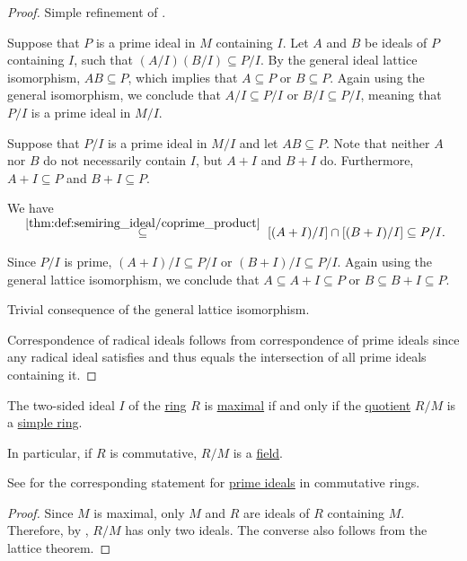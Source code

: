 \begin{proof}
   Simple refinement of .

  \SufficiencySubProof* Suppose that \( P \) is a prime ideal in \( M \) containing \( I \). Let \( A \) and \( B \) be ideals of \( P \) containing \( I \), such that \( (A / I) (B / I) \subseteq P / I \). By the general ideal lattice isomorphism, \( AB \subseteq P \), which implies that \( A \subseteq P \) or \( B \subseteq P \). Again using the general isomorphism, we conclude that \( A / I \subseteq P / I \) or \( B / I \subseteq P / I \), meaning that \( P / I \) is a prime ideal in \( M / I \).

  \NecessitySubProof* Suppose that \( P / I \) is a prime ideal in \( M / I \) and let \( AB \subseteq P \). Note that neither \( A \) nor \( B \) do not necessarily contain \( I \), but \( A + I \) and \( B + I \) do. Furthermore, \( A + I \subseteq P \) and \( B + I \subseteq P \).

  We have
  \begin{equation*}
    [(A + I) / I][(B + I) / I]
    \reloset {\ref{thm:def:semiring_ideal/coprime_product}} \subseteq
    [(A + I) / I] \cap [(B + I) / I]
    \subseteq
    P / I.
  \end{equation*}

  Since \( P / I \) is prime, \( (A + I) / I \subseteq P / I \) or \( (B + I) / I \subseteq P / I \). Again using the general lattice isomorphism, we conclude that \( A \subseteq A + I \subseteq P \) or \( B \subseteq B + I \subseteq P \).

   Trivial consequence of the general lattice isomorphism.

   Correspondence of radical ideals follows from correspondence of prime ideals since any radical ideal satisfies  and thus equals the intersection of all prime ideals containing it.
\end{proof}

\begin{corollary}\label{thm:quotient_by_maximal_ideal}
  The two-sided ideal \( I \) of the \hyperref[def:ring]{ring} \( R \) is \hyperref[def:semiring_ideal/maximal]{maximal} if and only if the \hyperref[def:ring/quotient]{quotient} \( R / M \) is a \hyperref[def:ring/simple]{simple ring}.

  In particular, if \( R \) is commutative, \( R / M \) is a \hyperref[def:field]{field}.

  See  for the corresponding statement for \hyperref[def:semiring_ideal/prime]{prime ideals} in commutative rings.
\end{corollary}
\begin{proof}
  Since \( M \) is maximal, only \( M \) and \( R \) are ideals of \( R \) containing \( M \). Therefore, by , \( R / M \) has only two ideals. The converse also follows from the lattice theorem.
\end{proof}
